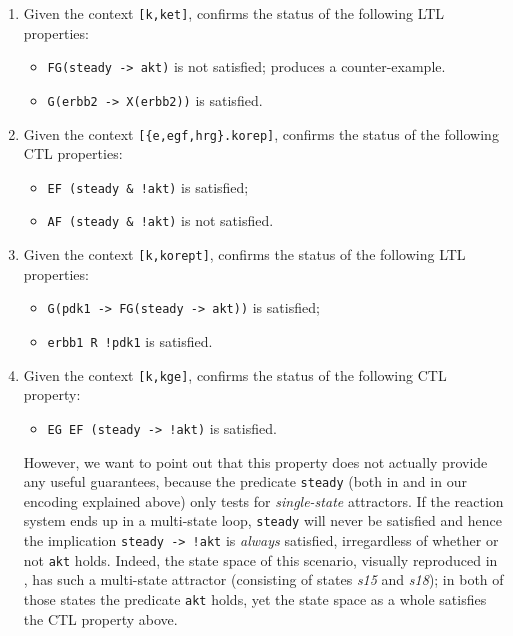 \begin{enumerate}
\item Given the context \verb=[k,ket]=, \GROOVE confirms the status of the following LTL properties:
\begin{itemize}
\item \verb=FG(steady -> akt)= is not satisfied; \GROOVE produces a counter-example.

\item \verb=G(erbb2 -> X(erbb2))= is satisfied.
\end{itemize}

\item Given the context \verb=[{e,egf,hrg}.korep]=, \GROOVE confirms the status of the following CTL properties:
\begin{itemize}
\item \verb=EF (steady & !akt)= is satisfied;
\item \verb=AF (steady & !akt)= is not satisfied.
\end{itemize}

\item Given the context \verb=[k,korept]=, \GROOVE confirms the status of the following LTL properties:
\begin{itemize}
\item \verb=G(pdk1 -> FG(steady -> akt))= is satisfied;
\item \verb=erbb1 R !pdk1= is satisfied.
\end{itemize}

\item Given the context \verb=[k,kge]=, \GROOVE confirms the status of the following CTL property:
\begin{itemize}
\item \verb=EG EF (steady -> !akt)= is satisfied. 
\end{itemize}
However, we want to point out that this property does not actually provide any useful guarantees, because the predicate \verb=steady= (both in \cite{DBLP:conf/cmsb/BallisBFO24} and in our encoding explained above) only tests for \emph{single-state} attractors. If the reaction system ends up in a multi-state loop, \verb=steady= will never be satisfied and hence the implication \verb=steady -> !akt= is \emph{always} satisfied, irregardless of whether or not \verb=akt= holds. Indeed, the state space of this scenario, visually reproduced in , has such a multi-state attractor (consisting of states \textit{s15} and \textit{s18}); in both of those states the predicate \verb=akt= holds, yet the state space as a whole satisfies the CTL property above.
\end{enumerate}
